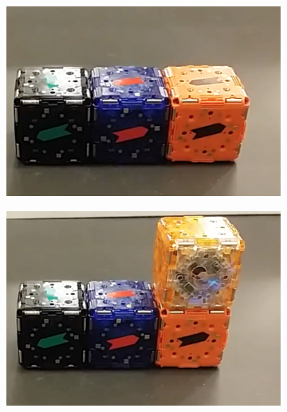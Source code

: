 \begin{figure}[h]  
	\centering
	\begin{subfigure}[b]{0.48\linewidth}
		\includegraphics[width=0.95\linewidth]{figures/arrows1.png}
		\subcaption{} 
	\end{subfigure}
	\begin{subfigure}[b]{0.48\linewidth}
		\includegraphics[width=0.95\linewidth]{figures/arrows2.png}
		\subcaption{} 
	\end{subfigure}
	

\end{figure}
